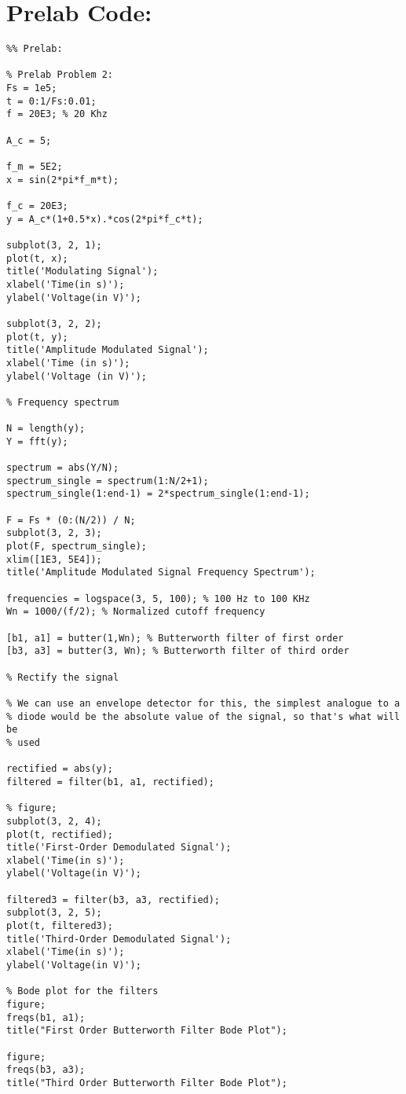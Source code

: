 \section{Prelab Code:}
\begin{verbatim}
%% Prelab:

% Prelab Problem 2:
Fs = 1e5;
t = 0:1/Fs:0.01;
f = 20E3; % 20 Khz

A_c = 5;

f_m = 5E2;
x = sin(2*pi*f_m*t);

f_c = 20E3;
y = A_c*(1+0.5*x).*cos(2*pi*f_c*t);

subplot(3, 2, 1);
plot(t, x);
title('Modulating Signal');
xlabel('Time(in s)');
ylabel('Voltage(in V)');

subplot(3, 2, 2);
plot(t, y);
title('Amplitude Modulated Signal');
xlabel('Time (in s)');
ylabel('Voltage (in V)');

% Frequency spectrum

N = length(y);
Y = fft(y);

spectrum = abs(Y/N);
spectrum_single = spectrum(1:N/2+1);
spectrum_single(1:end-1) = 2*spectrum_single(1:end-1);

F = Fs * (0:(N/2)) / N;
subplot(3, 2, 3);
plot(F, spectrum_single);
xlim([1E3, 5E4]);
title('Amplitude Modulated Signal Frequency Spectrum');

frequencies = logspace(3, 5, 100); % 100 Hz to 100 KHz
Wn = 1000/(f/2); % Normalized cutoff frequency

[b1, a1] = butter(1,Wn); % Butterworth filter of first order
[b3, a3] = butter(3, Wn); % Butterworth filter of third order

% Rectify the signal

% We can use an envelope detector for this, the simplest analogue to a
% diode would be the absolute value of the signal, so that's what will be
% used

rectified = abs(y);
filtered = filter(b1, a1, rectified);

% figure;
subplot(3, 2, 4);
plot(t, rectified);
title('First-Order Demodulated Signal');
xlabel('Time(in s)');
ylabel('Voltage(in V)');

filtered3 = filter(b3, a3, rectified);
subplot(3, 2, 5);
plot(t, filtered3);
title('Third-Order Demodulated Signal');
xlabel('Time(in s)');
ylabel('Voltage(in V)');

% Bode plot for the filters
figure;
freqs(b1, a1);
title("First Order Butterworth Filter Bode Plot");

figure;
freqs(b3, a3);
title("Third Order Butterworth Filter Bode Plot");
\end{verbatim}